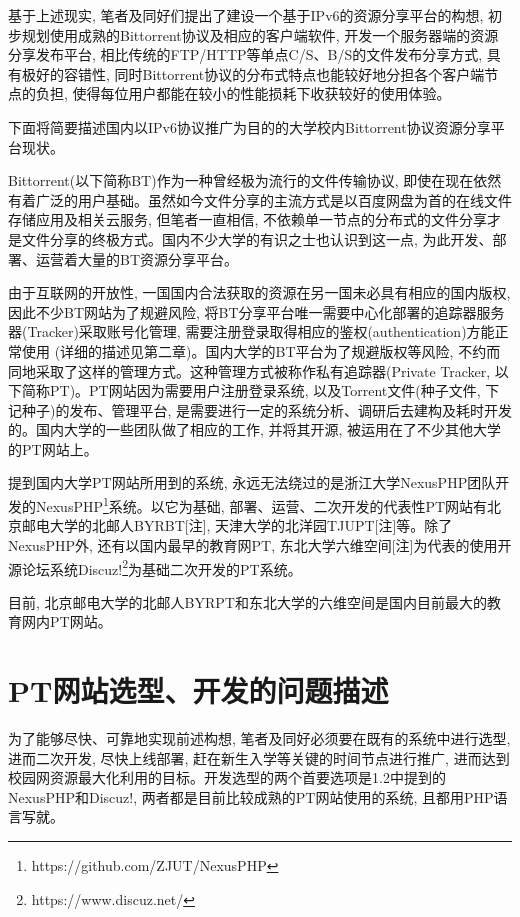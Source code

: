 基于上述现实, 笔者及同好们提出了建设一个基于IPv6的资源分享平台的构想, 初步规划使用成熟的Bittorrent协议及相应的客户端软件, 开发一个服务器端的资源分享发布平台, 相比传统的FTP/HTTP等单点C/S、B/S的文件发布分享方式, 具有极好的容错性, 同时Bittorrent协议的分布式特点也能较好地分担各个客户端节点的负担, 使得每位用户都能在较小的性能损耗下收获较好的使用体验。

下面将简要描述国内以IPv6协议推广为目的的大学校内Bittorrent协议资源分享平台现状。

Bittorrent(以下简称BT)作为一种曾经极为流行的文件传输协议, 即使在现在依然有着广泛的用户基础。虽然如今文件分享的主流方式是以百度网盘为首的在线文件存储应用及相关云服务, 但笔者一直相信, 不依赖单一节点的分布式的文件分享才是文件分享的终极方式。国内不少大学的有识之士也认识到这一点, 为此开发、部署、运营着大量的BT资源分享平台。

由于互联网的开放性, 一国国内合法获取的资源在另一国未必具有相应的国内版权, 因此不少BT网站为了规避风险, 将BT分享平台唯一需要中心化部署的追踪器服务器(Tracker)采取账号化管理, 需要注册登录取得相应的鉴权(authentication)方能正常使用 (详细的描述见第二章)。国内大学的BT平台为了规避版权等风险, 不约而同地采取了这样的管理方式。这种管理方式被称作私有追踪器(Private Tracker, 以下简称PT)。PT网站因为需要用户注册登录系统, 以及Torrent文件(种子文件, 下记种子)的发布、管理平台, 是需要进行一定的系统分析、调研后去建构及耗时开发的。国内大学的一些团队做了相应的工作, 并将其开源, 被运用在了不少其他大学的PT网站上。

提到国内大学PT网站所用到的系统, 永远无法绕过的是浙江大学NexusPHP团队开发的NexusPHP\footnote{https://github.com/ZJUT/NexusPHP}系统。以它为基础, 部署、运营、二次开发的代表性PT网站有北京邮电大学的北邮人BYRBT[注], 天津大学的北洋园TJUPT[注]等。除了NexusPHP外, 还有以国内最早的教育网PT, 东北大学六维空间[注]为代表的使用开源论坛系统Discuz!\footnote{https://www.discuz.net/}为基础二次开发的PT系统。

目前, 北京邮电大学的北邮人BYRPT和东北大学的六维空间是国内目前最大的教育网内PT网站。

\section{PT网站选型、开发的问题描述}
\label{sec:related_work}
为了能够尽快、可靠地实现前述构想, 笔者及同好必须要在既有的系统中进行选型, 进而二次开发, 尽快上线部署, 赶在新生入学等关键的时间节点进行推广, 进而达到校园网资源最大化利用的目标。开发选型的两个首要选项是1.2中提到的NexusPHP和Discuz!, 两者都是目前比较成熟的PT网站使用的系统, 且都用PHP语言写就。

